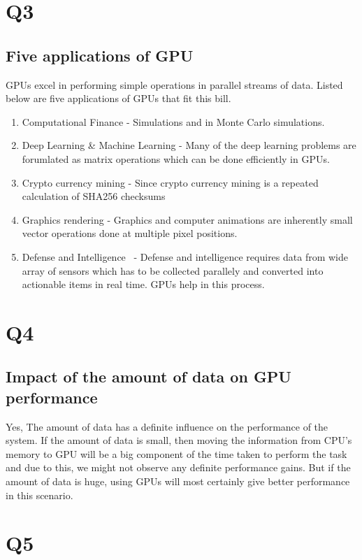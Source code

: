 \documentclass{article}
\begin{document}
\section{Q3}
\subsection{Five applications of GPU}
GPUs excel in performing simple operations in parallel streams of data.  Listed below are five applications of GPUs that fit this bill.
\begin{enumerate}
    \item  Computational Finance - Simulations and in Monte Carlo simulations.
    \item  Deep Learning \& Machine Learning - Many of the deep learning problems are forumlated as matrix operations which can be done efficiently in GPUs.
    \item  Crypto currency mining - Since crypto currency mining is a repeated calculation of SHA256 checksums~\cite{so:bitcoin}
    \item  Graphics rendering - Graphics and computer animations are inherently small vector operations done at multiple pixel positions.
    \item  Defense and Intelligence~\cite{gpu:defence_intelligence} -  Defense and intelligence requires data from wide array of sensors which has to be collected parallely and converted into actionable items in real time.  GPUs help in this process.
\end{enumerate}

\section{Q4}
\subsection{Impact of the amount of data on GPU performance}
Yes, The amount of data has a definite influence on the performance of the system.  If the amount of data is small, then moving the information from CPU's memory to GPU will be a big component of the time taken to perform the task and due to this, we might not observe any definite performance gains.  But if the amount of data is huge, using GPUs will most certainly give better performance in this scenario.

\section{Q5}
\end{document}
